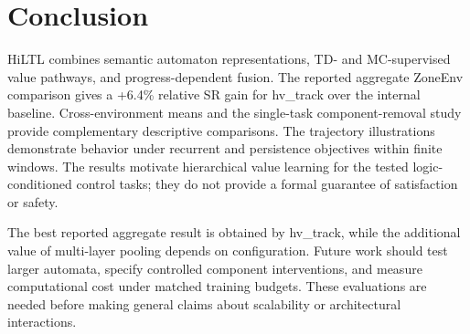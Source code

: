 \documentclass[journal]{IEEEtran}
\begin{document}
\section{Conclusion}
\label{sec:conclusion}

HiLTL combines semantic automaton representations, TD- and MC-supervised value pathways, and progress-dependent fusion. The reported aggregate ZoneEnv comparison gives a +6.4\% relative SR gain for hv\_track over the internal baseline. Cross-environment means and the single-task component-removal study provide complementary descriptive comparisons. The trajectory illustrations demonstrate behavior under recurrent and persistence objectives within finite windows. The results motivate hierarchical value learning for the tested logic-conditioned control tasks; they do not provide a formal guarantee of satisfaction or safety.

The best reported aggregate result is obtained by hv\_track, while the additional value of multi-layer pooling depends on configuration. Future work should test larger automata, specify controlled component interventions, and measure computational cost under matched training budgets. These evaluations are needed before making general claims about scalability or architectural interactions.






%
\end{document}
